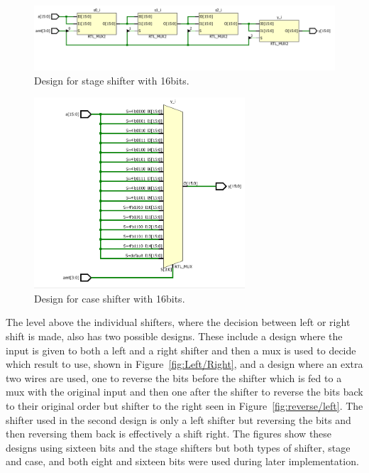 \documentclass{article}\usepackage{graphicx} %
\begin{document}
\begin{figure}[H]
\begin{center}
	\caption{Design for stage shifter with 16bits.}\label{fig:StageShifter16}
	\includegraphics[width=1.2\textwidth]{../images/Shifter_stage_16bit_design.png}
\end{center}
\end{figure}
\begin{figure}[H]
\begin{center}
	\caption{Design for case shifter with 16bits.}\label{fig:CaseShifter16}
	\includegraphics[width=0.7\textwidth]{../images/Shifter_case_16bit_design.png}
\end{center}
\end{figure}
The level above the individual shifters, where the decision between left or right shift is made, also has two possible designs. These include a design where the input is given to both a left and a right shifter and then a mux is used to decide which result to use, shown in Figure~\ref{fig:Left/Right}, and a design where an extra two wires are used, one to reverse the bits before the shifter which is fed to a mux with the original input and then one after the shifter to reverse the bits back to their original order but shifter to the right seen in Figure~\ref{fig:reverse/left}. The shifter used in the second design is only a left shifter but reversing the bits and then reversing them back is effectively a shift right. The figures show these designs using sixteen bits and the stage shifters but both types of shifter, stage and case, and both eight and sixteen bits were used during later implementation. 
\end{document}
